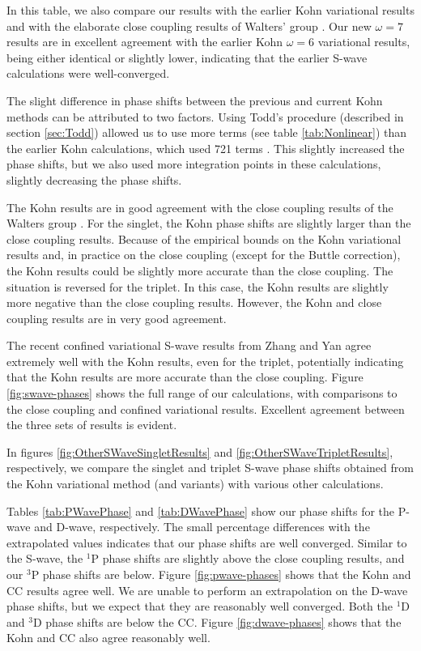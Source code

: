 \documentclass[preprint,showpacs,preprintnumbers,amsmath,amssymb]{revtex4}
\newcommand{\todoi}{\todo[inline]}
\begin{document}
In this table, we also compare our results with the earlier Kohn variational results \cite{VanReeth2003,VanReeth2004} and with the elaborate close coupling results of Walters' group \cite{Blackwood2002,Walters2004}. Our new $\omega = 7$ results are in excellent agreement with the earlier Kohn $\omega = 6$ variational results, being either identical or slightly lower, indicating that the earlier S-wave calculations were well-converged.


The slight difference in phase shifts between the previous and current Kohn methods can be attributed to two factors. Using Todd's procedure (described in section \ref{sec:Todd}) allowed us to use more terms (see table \ref{tab:Nonlinear}) than the earlier Kohn calculations, which used 721 terms  \cite{VanReeth2003}. This slightly increased the phase shifts, but we also used more integration points in these calculations, slightly decreasing the phase shifts.

The Kohn results are in good agreement with the close coupling results of the Walters group \cite{Blackwood2002,Walters2004}. For the singlet, the Kohn phase shifts are slightly larger than the close coupling results. Because of the empirical bounds on the Kohn variational results and, in practice on the close coupling (except for the Buttle correction), the Kohn results could be slightly more accurate than the close coupling.
The situation is reversed for the triplet. In this case, the Kohn results are slightly more negative than the close coupling results.
However, the Kohn and close coupling results are in very good agreement.

The recent confined variational S-wave results from Zhang and Yan \cite{Zhang2012} agree extremely well with the Kohn results, even for the triplet, potentially indicating that the Kohn results are more accurate than the close coupling. Figure \ref{fig:swave-phases} shows the full range of our calculations, with comparisons to the close coupling and confined variational results. Excellent agreement between the three sets of results is evident.


In figures \ref{fig:OtherSWaveSingletResults} and \ref{fig:OtherSWaveTripletResults}, respectively,
we compare the singlet and triplet S-wave phase shifts obtained from the Kohn variational
method (and variants) with various other calculations. \todoi{Compare?}

Tables \ref{tab:PWavePhase} and \ref{tab:DWavePhase} show our phase shifts for the P-wave and D-wave, respectively. The small percentage differences with the extrapolated values indicates that our phase shifts are well converged. Similar to the S-wave, the $^1$P phase shifts are slightly above the close coupling results, and our $^3$P phase shifts are below. Figure \ref{fig:pwave-phases} shows that the Kohn and CC results agree well. We are unable to perform an extrapolation on the D-wave phase shifts, but we expect that they are reasonably well converged. Both the $^1$D and $^3$D phase shifts are below the CC. Figure \ref{fig:dwave-phases} shows that the Kohn and CC also agree reasonably well. \todoi{What else should we say about this?}
\end{document}
